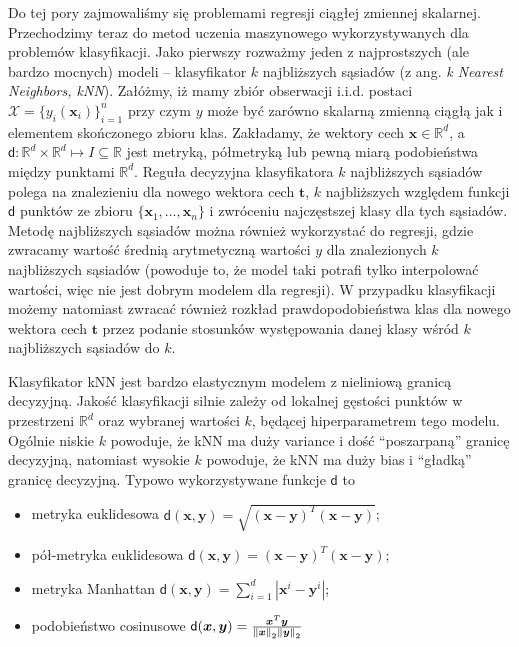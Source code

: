 \documentclass{myclass}
\numberwithin{equation}{subsection}
\begin{document}
Do tej pory zajmowaliśmy się problemami regresji ciągłej zmiennej skalarnej. Przechodzimy teraz do
metod uczenia maszynowego wykorzystywanych dla problemów klasyfikacji. Jako pierwszy rozważmy jeden
z najprostszych (ale bardzo mocnych) modeli -- klasyfikator \(k\) najbliższych sąsiadów (z ang.
\textit{k Nearest Neighbors, kNN}). Załóżmy, iż mamy zbiór obserwacji i.i.d. postaci \(\mathcal{X} =
\{y_i(\bm{x}_i)\}_{i=1}^n\) przy czym \(y\) może być zarówno skalarną zmienną ciągłą jak i elementem
skończonego zbioru klas. Zakładamy, że wektory cech \(\bm{x} \in \mathbb{R}^d\), a \(\mathsf{d}:
\mathbb{R}^d \times \mathbb{R}^d \mapsto I \subseteq \mathbb{R}\) jest metryką, półmetryką lub pewną
miarą podobieństwa między punktami \(\mathbb{R}^d\). Reguła decyzyjna klasyfikatora \(k\)
najbliższych sąsiadów polega na znalezieniu dla nowego wektora cech \(\bm{t}\), \(k\) najbliższych
względem funkcji \(\mathsf{d}\) punktów ze zbioru \(\{\bm{x}_1,\ldots,\bm{x}_n\}\) i zwróceniu
najczęstszej klasy dla tych sąsiadów. Metodę najbliższych sąsiadów można również wykorzystać do
regresji, gdzie zwracamy wartość średnią arytmetyczną wartości \(y\) dla znalezionych \(k\)
najbliższych sąsiadów (powoduje to, że model taki potrafi tylko interpolować wartości, więc nie jest
dobrym modelem dla regresji). W przypadku klasyfikacji możemy natomiast zwracać również rozkład
prawdopodobieństwa klas dla nowego wektora cech \(\bm{t}\) przez podanie stosunków występowania
danej klasy wśród \(k\) najbliższych sąsiadów do \(k\).

Klasyfikator kNN jest bardzo elastycznym modelem z nieliniową granicą decyzyjną. Jakość klasyfikacji
silnie zależy od lokalnej gęstości punktów w przestrzeni \(\mathbb{R}^d\) oraz wybranej wartości
\(k\), będącej hiperparametrem tego modelu. Ogólnie niskie \(k\) powoduje, że kNN ma duży variance i
dość \enquote{poszarpaną} granicę decyzyjną, natomiast wysokie \(k\) powoduje, że kNN ma duży bias i
\enquote{gładką} granicę decyzyjną. Typowo wykorzystywane funkcje \(\mathsf{d}\) to
\begin{itemize}
    \item metryka euklidesowa \(\mathsf{d}(\bm{x},\bm{y}) = \sqrt{(\bm{x} - \bm{y})^T(\bm{x} -
    \bm{y})}\);

    \item pół-metryka euklidesowa \(\mathsf{d}(\bm{x},\bm{y}) = (\bm{x} - \bm{y})^T(\bm{x} -
    \bm{y})\);

    \item metryka Manhattan \(\mathsf{d}(\bm{x}, \bm{y}) = \sum_{i=1}^d |\bm{x}^i - \bm{y}^i|\);
    
    \item podobieństwo cosinusowe \(\mathsf{d}(\bm{x}, \bm{y}) =
    \frac{\bm{x}^T\bm{y}}{\norm{\bm{x}}_2 \norm{\bm{y}}_2}\)
\end{itemize}
\end{document}
